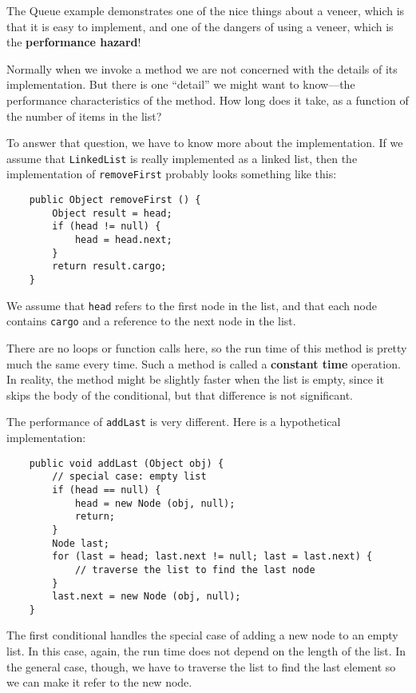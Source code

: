 The Queue example demonstrates one of the nice things about a
veneer, which is that it is easy to implement, and one of
the dangers of using a veneer, which is the {\bf performance
hazard}!

Normally when we invoke a method we are not concerned with the
details of its implementation.  But there is one ``detail''
we might want to know---the performance characteristics of the
method.  How long does it take, as a function of the number
of items in the list?

To answer that question, we have to know more about the
implementation.  If we assume that {\tt LinkedList} is really
implemented as a linked list, then the
implementation of {\tt removeFirst} probably looks something
like this:

\begin{verbatim}
    public Object removeFirst () {
        Object result = head;
        if (head != null) {
            head = head.next;
        }
        return result.cargo;
    }
\end{verbatim}
%
We assume that {\tt head} refers to the first node in the list,
and that each node contains {\tt cargo} and a reference to
the next node in the list.

There are no loops or function calls here, so the run time of this
method is pretty much the same every time.  Such a method is called a
{\bf constant time} operation.  In reality, the method might be
slightly faster when the list is empty, since it skips the body of the
conditional, but that difference is not significant.


The performance of {\tt addLast} is very different.  Here is
a hypothetical implementation:

\begin{verbatim}
    public void addLast (Object obj) {
        // special case: empty list
        if (head == null) {
            head = new Node (obj, null);
            return;
        }
        Node last;
        for (last = head; last.next != null; last = last.next) {
            // traverse the list to find the last node
        }
        last.next = new Node (obj, null);
    }
\end{verbatim}
%
The first conditional handles the special case of adding a new node to
an empty list.  In this case, again, the run time does not depend on
the length of the list.  In the general case, though, we have to
traverse the list to find the last element so we can make it refer to
the new node.


